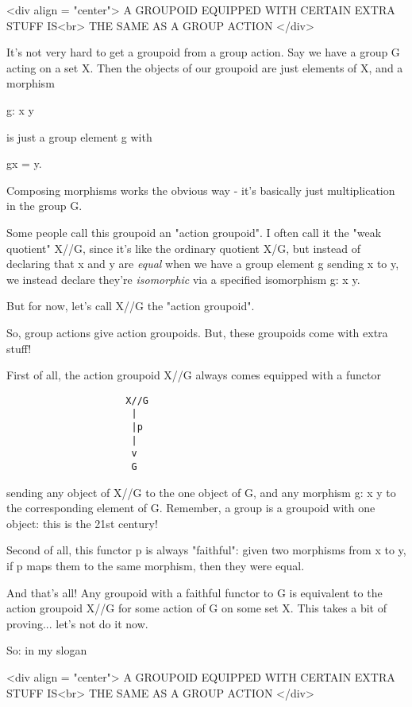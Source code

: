 <div align = "center">
             A GROUPOID EQUIPPED WITH CERTAIN EXTRA STUFF IS<br>
                     THE SAME AS A GROUP ACTION
</div>

It's not very hard to get a groupoid from a group action.  Say we have
a group G acting on a set X.   Then the objects of our groupoid are 
just elements of X, and a morphism

g: x \to  y

is just a group element g with 

gx = y.

Composing morphisms works the obvious way - it's basically just 
multiplication in the group G.

Some people call this groupoid an "action groupoid".  I often call 
it the "weak quotient" X//G, since it's like the ordinary quotient 
X/G, but instead of declaring that x and y are \emph{equal} when we have 
a group element g sending x to y, we instead declare they're 
\emph{isomorphic} via a specified isomorphism g: x \to  y.  

But for now, let's call X//G the "action groupoid".

So, group actions give action groupoids.  But, these groupoids come 
with extra stuff!

First of all, the action groupoid X//G always comes equipped with a
functor 

\begin{verbatim}
                     X//G 
                      |
                      |p
                      |
                      v
                      G
\end{verbatim}
    
sending any object of X//G to the one object of G, and any morphism 
g: x \to  y to the corresponding element of G.   Remember, a group is 
a groupoid with one object: this is the 21st century!  

Second of all, this functor p is always "faithful": given
two morphisms from x to y, if p maps them to the same morphism, then
they were equal.

And that's all!  Any groupoid with a faithful functor to G is
equivalent to the action groupoid X//G for some action of G on some 
set X.  This takes a bit of proving... let's not do it now.

So: in my slogan

<div align = "center">
             A GROUPOID EQUIPPED WITH CERTAIN EXTRA STUFF IS<br>
                     THE SAME AS A GROUP ACTION
</div>

